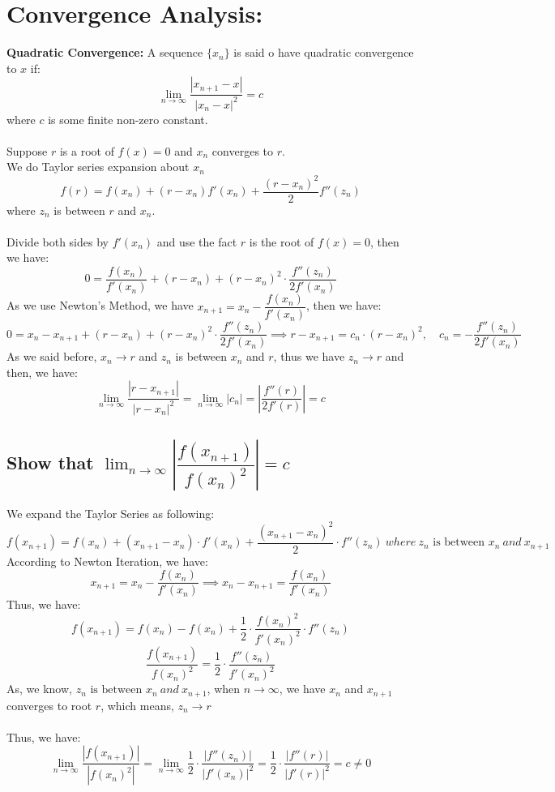 \documentclass [9 pt]{article}
\theoremstyle{definition}
\begin{document}
\newpage
\section*{Convergence Analysis:}
\textbf{Quadratic Convergence:}
A sequence $\{ x_n \}$ is said o have quadratic convergence to $x$ if:
$$ \lim_{n \to \infty} \dfrac{|x_{n+1} - x|}{ |x_n - x|^2 } = c $$
where $c$ is some finite non-zero constant.\\
\\
Suppose $r$ is a root of $f(x) = 0$ and $x_n$ converges to $r$.\\
We do Taylor series expansion about $x_n$
$$f(r) = f(x_n) + (r - x_n) f'(x_n) + \dfrac{(r - x_n)^2}{2} f''(z_n)$$
where $z_n$ is between $r$ and $x_n$.\\
\\
Divide both sides by $f'(x_n)$ and use the fact $r$ is the root of $f(x) = 0$, then we have:
$$ 0 = \dfrac{f(x_n)}{f'(x_n)} + (r - x_n) + (r - x_n)^2 \cdot \dfrac{f''(z_n)}{2f'(x_n)} $$
As we use Newton's Method, we have $x_{n+1} = x_n - \dfrac{f(x_n)}{f'(x_n)} $, then we have:
$$ 0 = x_n - x_{n+1} + (r - x_n) + (r - x_n)^2 \cdot \dfrac{f''(z_n)}{2f'(x_n)} \implies r - x_{n+1} = c_n \cdot (r - x_n)^2, \quad c_n = - \dfrac{f''(z_n)}{2f'(x_n)} $$
As we said before, $x_n \to r$ and $z_n $ is between $x_n$ and $r$, thus we have $z_n \to r$ and then, we have:
$$ \lim_{n \to \infty} \dfrac{|r - x_{n+1}|}{ |r - x_n|^2 } = \lim_{n \to \infty} |c_n| = |\dfrac{f''(r)}{2f'(r)}|  = c $$

\subsection*{Show that $\lim_{n\to \infty} | \dfrac{f(x_{n+1})}{f(x_n)^2} | = c$}
\begin{mdframed}
	We expand the Taylor Series as following:
$$ f(x_{n+1}) = f(x_n) + (x_{n+1} - x_n )\cdot f'(x_n) + \dfrac{(x_{n+1} - x_{n})^2}{2}\cdot f''(z_n)\ where\  z_n \text{ is between } x_n \ and\ x_{n+1} $$
According to Newton Iteration, we have:
$$ x_{n+1} = x_n - \dfrac{f(x_n)}{f'(x_n)}  \implies x_n - x_{n+1} =   \dfrac{f(x_n)}{f'(x_n)}  $$
Thus, we have:
$$ f(x_{n+1}) = f(x_n) - f(x_n) + \dfrac{ 1 }{2} \cdot \dfrac{f(x_n)^2}{f'(x_n)^2} \cdot  f''(z_n)  $$
$$ \dfrac{f(x_{n+1})}{f(x_n)^2} = \dfrac{1}{2} \cdot \dfrac{f''(z_n)}{f'(x_n)^2} $$
As, we know, $  z_n \text{ is between } x_n \ and\ x_{n+1} $, when $n \to \infty$, we have $x_n$ and $x_{n+1}$ converges to root $r$, which means, $z_n \to r$\\
\\
Thus, we have:
$$ \lim_{n \to \infty}  \dfrac{|f(x_{n+1})|}{|f(x_n)^2|} = \lim_{n \to \infty} \dfrac{1}{2} \cdot \dfrac{|f''(z_n)|}{|f'(x_n)|^2} = \dfrac{1}{2} \cdot \dfrac{|f''(r)|}{|f'(r)|^2} = c \neq 0 $$
\end{mdframed}
\end{document}
